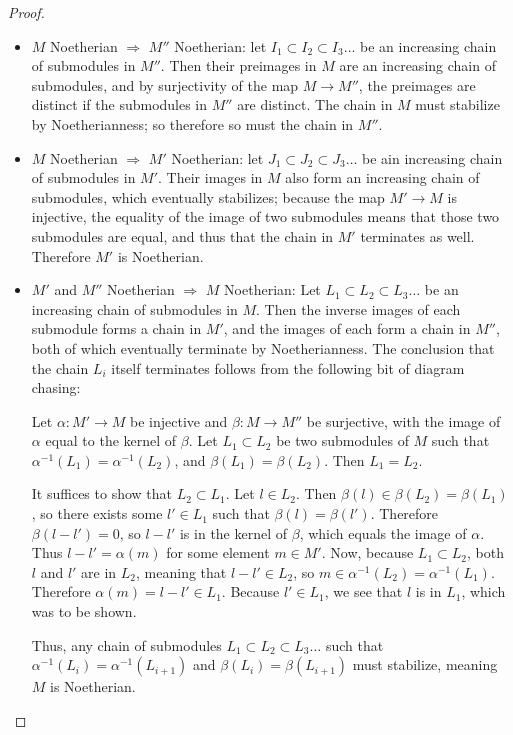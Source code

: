 \documentclass[12pt]{article}
\theoremstyle{definition}
\begin{document}
\begin{proof}
	\begin{itemize}
		\item $M$ Noetherian $\Rightarrow$ $M''$ Noetherian: let $I_1 \subset I_2 \subset I_3 \dots$ be an increasing chain of submodules in $M''$. Then their preimages in $M$ are an increasing chain of submodules, and by surjectivity of the map $M \to M''$, the preimages are distinct if the submodules in $M''$ are distinct. The chain in $M$ must stabilize by Noetherianness; so therefore so must the chain in $M''$.
		\item $M$ Noetherian $\Rightarrow$ $M'$ Noetherian: let $J_1 \subset J_2 \subset J_3 \dots$ be ain increasing chain of submodules in $M'$. Their images in $M$ also form an increasing chain of submodules, which eventually stabilizes; because the map $M' \to M$ is injective, the equality of the image of two submodules means that those two submodules are equal, and thus that the chain in $M'$ terminates as well. Therefore $M'$ is Noetherian.
		\item $M'$ and $M''$ Noetherian $\Rightarrow$ $M$ Noetherian: Let $L_1 \subset L_2 \subset L_3 \dots$ be an increasing chain of submodules in $M$. Then the inverse images of each submodule forms a chain in $M'$, and the images of each form a chain in $M''$, both of which eventually terminate by Noetherianness. The conclusion that the chain $L_i$ itself terminates follows from the following bit of diagram chasing:
			\par Let $\alpha: M' \to M$ be injective and $\beta: M \to M''$ be surjective, with the image of $\alpha$ equal to the kernel of $\beta$. Let $L_1 \subset L_2$ be two submodules of $M$ such that $\alpha^{-1}(L_1) = \alpha^{-1}(L_2)$, and $\beta(L_1) = \beta(L_2)$. Then $L_1 = L_2$.
			\par It suffices to show that $L_2 \subset L_1$. Let $l \in L_2$. Then $\beta(l) \in \beta(L_2) = \beta(L_1)$, so there exists some $l' \in L_1$ such that $\beta(l) = \beta(l')$. Therefore $\beta(l - l') = 0$, so $l - l'$ is in the kernel of $\beta$, which equals the image of $\alpha$. Thus $l - l' = \alpha(m)$ for some element $m \in M'$. Now, because $L_1 \subset L_2$, both $l$ and $l'$ are in $L_2$, meaning that $l-l' \in L_2$, so $m \in \alpha^{-1}(L_2) = \alpha^{-1}(L_1)$. Therefore $\alpha(m) = l-l' \in L_1$. Because $l' \in L_1$, we see that $l$ is in $L_1$, which was to be shown. 
			\par Thus, any chain of submodules $L_1 \subset L_2 \subset L_3 \dots$ such that $\alpha^{-1}(L_i) = \alpha^{-1}(L_{i+1})$ and $\beta(L_i) = \beta(L_{i+1})$ must stabilize, meaning $M$ is Noetherian.
	\end{itemize}
\end{proof}
\begin{thebibliography}{}
\end{thebibliography}
\end{document}
